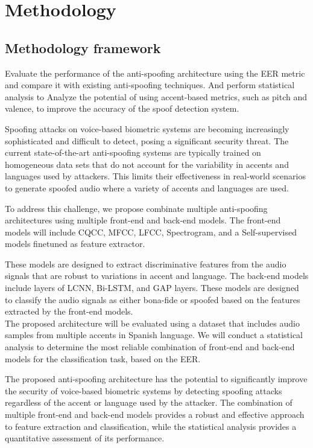 
\chapter{Methodology}

\section{Methodology framework}

Evaluate the performance of the anti-spoofing architecture using the \ac{EER} metric and compare it with existing anti-spoofing techniques. And perform statistical analysis to Analyze the potential of using accent-based metrics, such as pitch and valence, to improve the accuracy of the spoof detection system.

Spoofing attacks on voice-based biometric systems are becoming increasingly sophisticated and difficult to detect, posing a significant security threat. The current state-of-the-art anti-spoofing systems are typically trained on homogeneous data sets that do not account for the variability in accents and languages used by attackers. This limits their effectiveness in real-world scenarios to generate spoofed audio where a variety of accents and languages are used.

To address this challenge, we propose combinate multiple anti-spoofing architectures using multiple front-end and back-end models. The front-end models will include \acs{CQCC}, \acs{MFCC}, \acs{LFCC}, Spectrogram, and a Self-supervised models finetuned as feature extractor.

These models are designed to extract discriminative features from the audio signals that are robust to variations in accent and language. The back-end models include layers of \acs{LCNN}, \acs{Bi-LSTM}, and \acs{GAP} layers. These models are designed to classify the audio signals as either bona-fide or spoofed based on the features extracted by the front-end models.\\

The proposed architecture will be evaluated using a dataset that includes audio samples from multiple accents in Spanish language. We will conduct a statistical analysis to determine the most reliable combination of front-end and back-end models for the classification task, based on the \acs{EER}.

The proposed anti-spoofing architecture has the potential to significantly improve the security of voice-based biometric systems by detecting spoofing attacks regardless of the accent or language used by the attacker. The combination of multiple front-end and back-end models provides a robust and effective approach to feature extraction and classification, while the statistical analysis provides a quantitative assessment of its performance.

